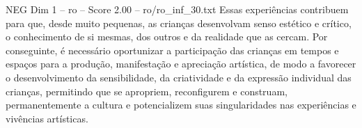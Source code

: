 \begin{textsample}{NEG Dim 1 – ro – Score 2.00 – ro/ro\_inf\_30.txt}
Essas experiências contribuem para que, desde muito pequenas, as crianças desenvolvam senso estético e crítico, o conhecimento de si mesmas, dos outros e da realidade que as cercam.
Por conseguinte, é necessário oportunizar a participação das crianças em tempos e espaços para a produção, manifestação e apreciação artística, de modo a favorecer o desenvolvimento da sensibilidade, da criatividade e da expressão individual das crianças, permitindo que se apropriem, reconfigurem e construam, permanentemente a cultura e potencializem suas singularidades nas experiências e vivências artísticas.

\end{textsample}
